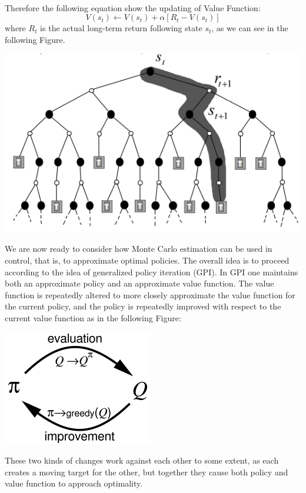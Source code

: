 \documentclass[11pt]{article}
\theoremstyle{plain}
\theoremstyle{definition}
\begin{document}
\\
Therefore the following equation show the updating of Value Function:
\begin{equation}
V(s_t) \leftarrow V(s_t) + \alpha [R_t -  V(s_t)]
\end{equation}
where $R_t$ is the actual long-term return following state $s_t$, as we can see in the following Figure.
\begin{center}
\includegraphics[scale=0.7]{1}
\end{center}
We are now ready to consider how Monte Carlo estimation can be used in control, that is, to approximate optimal policies. The overall idea is to proceed according to the idea of generalized policy iteration (GPI). In GPI one maintains both an approximate policy and an approximate value function. The value function is repeatedly altered to more closely approximate the value function for the current policy, and the policy is repeatedly improved with respect to the current value function as in the following Figure:
\begin{center}
\includegraphics[scale=0.7]{2}
\end{center}
These two kinds of changes work against each other to some extent, as each creates a moving target for the other, but together they cause both policy and value function to approach optimality.
\end{document}
